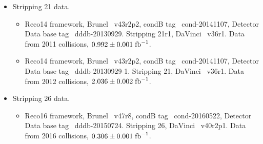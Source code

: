 \begin{itemize}
\item Stripping 21 data.
\begin{itemize}
\item Reco14 framework, Brunel~\cite{brunel} v43r2p2, condB tag~\cite{condDB} cond-20141107, Detector Data base tag~\cite{dddb} dddb-20130929. Stripping 21r1, DaVinci~\cite{DaVinci} v36r1. 
Data from 2011 collisions, $0.992 \pm 0.001 \;\text{fb}^{-1}$.
\item Reco14 framework, Brunel~\cite{brunel} v43r2p2, condB tag~\cite{condDB} cond-20141107, Detector Data base tag~\cite{dddb} dddb-20130929-1. Stripping 21, DaVinci~\cite{DaVinci} v36r1. 
Data from 2012 collisions, $2.036 \pm 0.002 \;\text{fb}^{-1}$.


\end{itemize}
\item Stripping 26 data.
\begin{itemize}
\item Reco16 framework, Brunel~\cite{brunel} v47r8, condB tag~\cite{condDB} cond-20160522, Detector Data base tag~\cite{dddb} dddb-20150724. Stripping 26, DaVinci~\cite{DaVinci} v40r2p1. 
Data from 2016 collisions, $0.306 \pm 0.001 \;\text{fb}^{-1}$.
\end{itemize}
\end{itemize}





